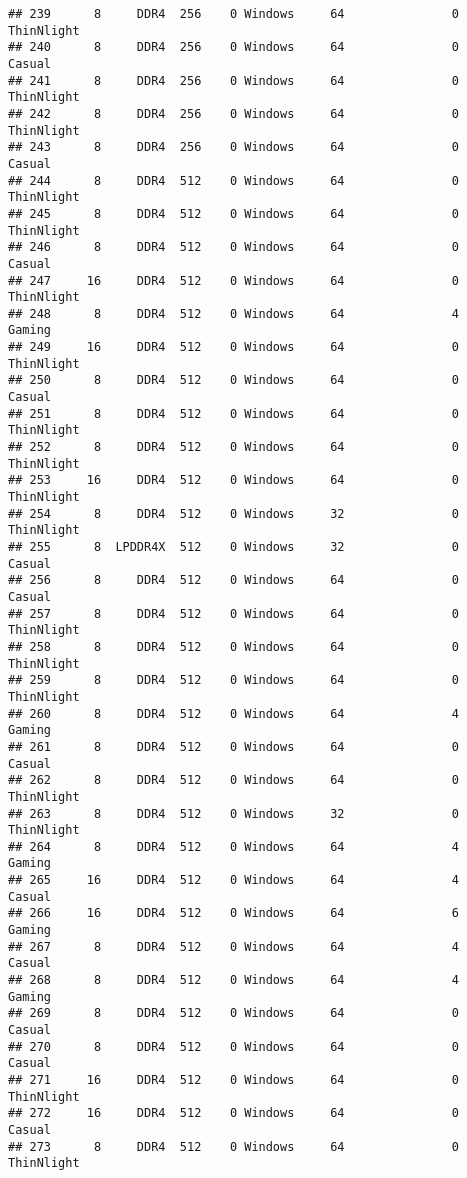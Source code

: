 \documentclass[
]{article}
\begin{document}
\begin{verbatim}
## 239      8     DDR4  256    0 Windows     64               0 ThinNlight
## 240      8     DDR4  256    0 Windows     64               0     Casual
## 241      8     DDR4  256    0 Windows     64               0 ThinNlight
## 242      8     DDR4  256    0 Windows     64               0 ThinNlight
## 243      8     DDR4  256    0 Windows     64               0     Casual
## 244      8     DDR4  512    0 Windows     64               0 ThinNlight
## 245      8     DDR4  512    0 Windows     64               0 ThinNlight
## 246      8     DDR4  512    0 Windows     64               0     Casual
## 247     16     DDR4  512    0 Windows     64               0 ThinNlight
## 248      8     DDR4  512    0 Windows     64               4     Gaming
## 249     16     DDR4  512    0 Windows     64               0 ThinNlight
## 250      8     DDR4  512    0 Windows     64               0     Casual
## 251      8     DDR4  512    0 Windows     64               0 ThinNlight
## 252      8     DDR4  512    0 Windows     64               0 ThinNlight
## 253     16     DDR4  512    0 Windows     64               0 ThinNlight
## 254      8     DDR4  512    0 Windows     32               0 ThinNlight
## 255      8  LPDDR4X  512    0 Windows     32               0     Casual
## 256      8     DDR4  512    0 Windows     64               0     Casual
## 257      8     DDR4  512    0 Windows     64               0 ThinNlight
## 258      8     DDR4  512    0 Windows     64               0 ThinNlight
## 259      8     DDR4  512    0 Windows     64               0 ThinNlight
## 260      8     DDR4  512    0 Windows     64               4     Gaming
## 261      8     DDR4  512    0 Windows     64               0     Casual
## 262      8     DDR4  512    0 Windows     64               0 ThinNlight
## 263      8     DDR4  512    0 Windows     32               0 ThinNlight
## 264      8     DDR4  512    0 Windows     64               4     Gaming
## 265     16     DDR4  512    0 Windows     64               4     Casual
## 266     16     DDR4  512    0 Windows     64               6     Gaming
## 267      8     DDR4  512    0 Windows     64               4     Casual
## 268      8     DDR4  512    0 Windows     64               4     Gaming
## 269      8     DDR4  512    0 Windows     64               0     Casual
## 270      8     DDR4  512    0 Windows     64               0     Casual
## 271     16     DDR4  512    0 Windows     64               0 ThinNlight
## 272     16     DDR4  512    0 Windows     64               0     Casual
## 273      8     DDR4  512    0 Windows     64               0 ThinNlight

\end{verbatim}
\end{document}

